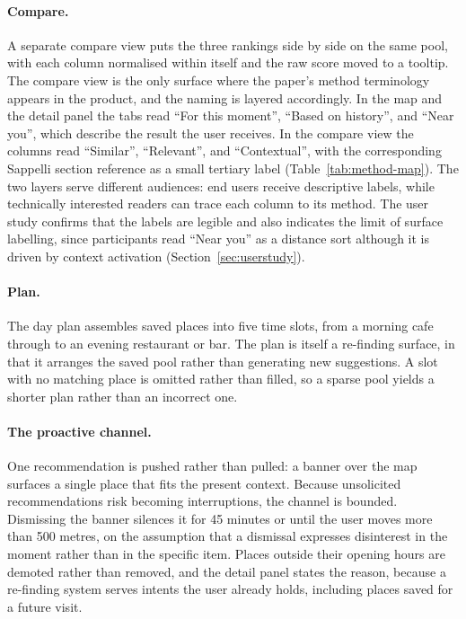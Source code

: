 \documentclass[acmlarge]{acmart}
\begin{document}
\paragraph{Compare.}
A separate compare view puts the three rankings side by side on the same
pool, with each column normalised within itself and the raw score moved to
a tooltip. The compare view is the only surface where the paper's method terminology
appears in the product, and the naming is layered accordingly. In the map
and the detail panel the tabs read ``For this moment'', ``Based on
history'', and ``Near you'', which describe the result the user receives.
In the compare view the columns read ``Similar'', ``Relevant'', and
``Contextual'', with the corresponding Sappelli section reference as a
small tertiary label (Table~\ref{tab:method-map}). The two layers serve
different audiences: end users receive descriptive labels, while
technically interested readers can trace each column to its method. The
user study confirms that the labels are legible and also indicates the
limit of surface labelling, since participants read ``Near you'' as a
distance sort although it is driven by context activation
(Section~\ref{sec:userstudy}).

\paragraph{Plan.}
The day plan assembles saved places into five time slots, from a morning
cafe through to an evening restaurant or bar. The plan is itself a
re-finding surface, in that it arranges the saved pool rather than
generating new suggestions. A slot with no matching place is omitted rather
than filled, so a sparse pool yields a shorter plan rather than an
incorrect one.

\paragraph{The proactive channel.}
One recommendation is pushed rather than pulled: a banner over the map
surfaces a single place that fits the present context. Because unsolicited
recommendations risk becoming interruptions, the channel is bounded.
Dismissing the banner silences it for 45 minutes or until the user moves
more than 500 metres, on the assumption that a dismissal expresses
disinterest in the moment rather than in the specific item. Places outside
their opening hours are demoted rather than removed, and the detail panel
states the reason, because a re-finding system serves intents the user
already holds, including places saved for a future visit.
\end{document}
